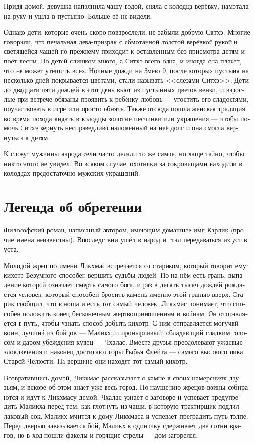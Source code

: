 \documentclass[a4paper,12pt,fleqn]{book}\usepackage{cooltooltips}\usepackage{polyglossia}\setdefaultlanguage[babelshorthands=true]{russian}\setotherlanguage{english}\defaultfontfeatures{Ligatures=TeX,Mapping=tex-text} \usepackage{xcolor}\definecolor{lightgray}{HTML}{bbbbbb}\color{lightgray}\newcommand{\ml}[3]{\textenglish{\textcolor{black}{#3}}}
\begin{document}
{Придя домой, девушка наполнила чашу водой, сняла с колодца верёвку, намотала на руку и ушла в пустыню.
Больше её не видели.

Однако дети, которые очень скоро повзрослели, не забыли добрую Ситхэ.
Многие говорили, что печальная дева-призрак с обмотанной толстой верёвкой рукой и светящейся чашей по-прежнему приходит к оставленным без присмотра детям и поёт песни.
Но детей слишком много, а Ситхэ всего одна, и иногда она плачет, что не может утешить всех.
Ночные дожди на Змею 9, после которых пустыня на несколько дней покрывается цветами, стали называть <<слезами Ситхэ>>.
Дети до двадцати пяти дождей в этот день вьют из пустынных цветов венки, и взрослые при встрече обязаны проявить к ребёнку любовь --- угостить его сладостями, поучаствовать в игре или просто обнять.
Также отсюда пошла женская традиция во время похода кидать в колодцы золотые песчинки или украшения --- чтобы помочь Ситхэ вернуть несправедливо наложенный на неё долг и она смогла вернуться к детям.

К слову: мужчины народа сели часто делали то же самое, но чаще тайно, чтобы никто этого не увидел.
Во всяком случае, охотники за сокровищами находили в колодцах предостаточно мужских украшений.

\section{Легенда об обретении}

Философский роман, написаный автором, имеющим домашнее имя Карлик (прочие имена неизвестны).
Впоследствии ушёл в народ и стал передаваться из уст в уста.

Молодой жрец по имени Ликхмас встречается со стариком, который говорит ему: кихотр Безумного способен вершить судьбы людей.
Но на нём есть грань, выпадение которой означает смерть самого бога, и раз в десять тысяч дождей рождается человек, который способен бросить камень именно этой гранью вверх.
Старик сообщил, что юноша и есть тот самый человек.
Ликхмас понимает, что способен положить конец бесконечным жертвоприношениям и войнам.
Он отправляется в путь, чтобы узнать способ добыть кихотр.
С ним отправляется могучий воин, лучший из бойцов --- Маликх, и пронырливый, обладающий сладким голосом и даром убеждения купец --- Чхалас.
Вместе друзья преодолевают ужасные злоключения и наконец достигают горы Рыбья Флейта --- самого высокого пика Старой Челюсти.
На вершине они находят тот самый кихотр.

Возвратившись домой, Ликхмас рассказывает о камне и своих намерениях друзьям, и вскоре об этом знает уже весь город.
По наущению жрецов воины собираются и идут к Ликхмасу домой.
Чхалас узнаёт о заговоре и успевает предупредить Маликха перед тем, как глотнуть из чаши, в которую трактирщик подлил лаковый сок.
Маликх мчится к дому Ликхмаса и успевает преградить путь толпе.
Перед дверью завязывается бой, Маликх в одиночку сдерживает две сотни врагов, но в ход пошли факелы и горящие стрелы --- дом загорелся.

}
\end{document}
